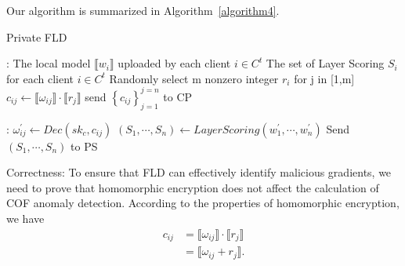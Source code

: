 Our algorithm is summarized in Algorithm~\ref{algorithm4}.\\
\begin{algorithm}[t!]
    \caption{Private FLD}\label{algorithm4}
    \begin{algorithmic} [1]
        \algrenewcommand{}
        \Require: The local model $\llbracket{w_{i}}\rrbracket$ uploaded by each client $ i\in C^{t} $
        \algrenewcommand{} 
        \Require  The set of Layer Scoring $S_{i}$ for each client $ i\in C^{t}$ 
        \algrenewcommand{}
        \Require
        \State  Randomly select m nonzero integer $r_i $ for j in [1,m]
         
        \State $ c_{ij} \gets \llbracket{\omega_{ij} }\rrbracket\cdot \llbracket{r_{j} }\rrbracket  $
        \EndFor
        \State send $\left \{  c_{ij}  \right \} _{j=1}^{j=n} $ to CP
    \end{algorithmic}
    \begin{algorithmic}[1]
    \algrenewcommand{}
    \Require:
     
        \State  $ \omega _{ij}^{'} \gets Dec(sk_{c},c_{ij} ) $
    \EndFor
    \State $\left(S_{1} ,\cdots,S_{n}\right)\gets Layer Scoring\left(w_{1}^{'},\cdots,w_{n}^{'}\right)$
    \State Send $\left(S_{1} ,\cdots,S_{n}\right)$ to PS
    \end{algorithmic}
\end{algorithm}
Correctness: To ensure that FLD can effectively identify malicious gradients, we need to prove that homomorphic encryption does not affect the calculation of COF anomaly detection.
According to the properties of homomorphic encryption, we have 
\begin{equation}
    \begin{split}\label{hm}
	  c_{ij}
	& =  \llbracket{\omega_{ij} }\rrbracket\cdot \llbracket{r_{j} }\rrbracket \\
	& =  \llbracket{\omega_{ij} } + {r_{j} }\rrbracket .
    \end{split}
\end{equation}
